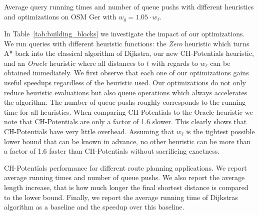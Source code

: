 \documentclass[letterpaper]{article} %
\begin{document}
\begin{table}
\centering
\caption{Average query running times and number of queue pushs with different heuristics and optimizations on OSM Ger with $w_q = 1.05 \cdot w_\ell$.}\label{tab:building_blocks}

\end{table}

In Table~\ref{tab:building_blocks} we investigate the impact of our optimizations.
We run queries with different heuristic functions: the \emph{Zero} heuristic which turns A* back into the classical algorithm of Dijkstra, our new CH-Potentials heuristic, and an \emph{Oracle} heuristic where all distances to $t$ with regards to $w_\ell$ can be obtained immediately.
We first observe that each one of our optimizations gains useful speedups regardless of the heuristic used.
Our optimizations do not only reduce heuristic evaluations but also queue operations which always accelerates the algorithm.
The number of queue pushs roughly corresponds to the running time for all heuristics.
When comparing CH-Potentials to the Oracle heuristic we note that CH-Potentials are only a factor of 1.6 slower.
This clearly shows that CH-Potentials have very little overhead.
Assuming that $w_\ell$ is the tightest possible lower bound that can be known in advance, no other heuristic can be more than a factor of 1.6 faster than CH-Potentials without sacrificing exactness.

\begin{table}
\centering
\caption{
CH-Potentials performance for different route planning applications.
We report average running times and number of queue pushs.
We also report the average length increase, that is how much longer the final shortest distance is compared to the lower bound.
Finally, we report the average running time of Dijkstras algorithm as a baseline and the speedup over this baseline.
}\label{tab:applications}

\end{table}
\end{document}
